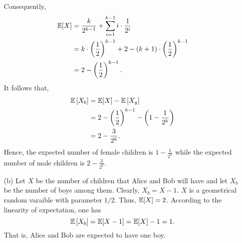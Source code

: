 \begin{enumerate}
\begin{align*}
  \end{align*}
  Consequently,
  \begin{align*}
    \mathbb{E}[X]
      &= \frac{k}{2^{k-1}} + \sum_{i = 1}^{k-1} i \cdot \frac{1}{2^{i}} \\
      &= k \cdot \left(\frac{1}{2}\right)^{k-1} + 2 - \left( k + 1 \right) \cdot \left(\frac{1}{2}\right)^{k-1} \\
      &= 2 - \left(\frac{1}{2}\right)^{k-1}.
  \end{align*}
  It follows that,
  \begin{align*}
    \mathbb{E}\left[X_b\right]
      &= \mathbb{E}[X] - \mathbb{E}\left[X_g\right] \\
      &= 2 - \left(\frac{1}{2}\right)^{k-1} - \left( 1 - \frac{1}{2^k} \right) \\
      &= 2 - \frac{3}{2^k}.
  \end{align*}
  Hence, the expected number of female children is $1 - \frac{1}{2^k}$ while the
  expected number of male children is $2 - \frac{3}{2^k}$.

  \item[(b)] Let $X$ be the number of children that Alice and Bob will have and
  let $X_b$ be the number of boys among them. Clearly, $X_b = X - 1$. $X$ is a
  geometrical random varaible with parameter $1/2$. Thus, $\mathbb{E}[X] = 2$.
  According to the linearity of expectation, one has
  \[
    \mathbb{E}\left[X_b\right] = \mathbb{E}[X - 1] = \mathbb{E}[X] - 1 = 1.
  \]
  That is, Alice and Bob are expected to have one boy.
\end{enumerate}
